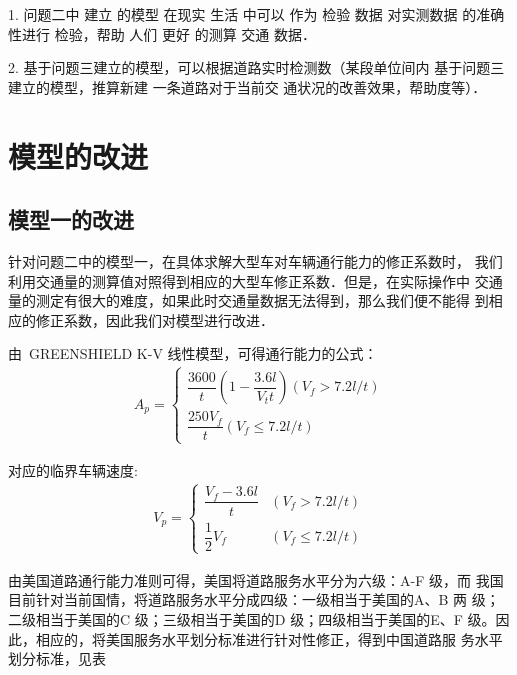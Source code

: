 \documentclass[12pt,a4paper]{nmmcm}
\begin{document}
1. 问题二中 建立 的模型 在现实 生活 中可以 作为 检验 数据 对实测数据 的准确 性进行 检验，帮助 人们
更好 的测算 交通 数据．

2. 基于问题三建立的模型，可以根据道路实时检测数（某段单位间内 基于问题三建立的模型，推算新建
一条道路对于当前交 通状况的改善效果，帮助度等）．

\section{模型的改进}

\subsection{模型一的改进}
针对问题二中的模型一，在具体求解大型车对车辆通行能力的修正系数时，
我们利用交通量的测算值对照得到相应的大型车修正系数．但是，在实际操作中
交通量的测定有很大的难度，如果此时交通量数据无法得到，那么我们便不能得
到相应的修正系数，因此我们对模型进行改进．

由~GREENSHIELD K-V 线性模型，可得通行能力的公式：
\begin{align}
  A_{p}=\begin{cases}
          \dfrac{3600}{t}\left(1-\dfrac{3.6 l}{V_{t} t}\right)\left(V_{f}>7.2 l / t\right) \\
          \dfrac{250 V_{f}}{t}\left(V_{f} \leq 7.2 l / t\right)
        \end{cases}
\end{align}

对应的临界车辆速度:
\begin{align}
  V_{p}=\begin{cases}
          \dfrac{V_{f}-3.6 l}{t} & \left(V_{f}>7.2 l / t\right)      \\
          \dfrac{1}{2} V_{f}     & \left(V_{f} \leq 7.2 l / t\right)
        \end{cases}
\end{align}

由美国道路通行能力准则可得，美国将道路服务水平分为六级：A-F 级，而
我国目前针对当前国情，将道路服务水平分成四级：一级相当于美国的A、B 两
级；二级相当于美国的C 级；三级相当于美国的D 级；四级相当于美国的E、F
级。因此，相应的，将美国服务水平划分标准进行针对性修正，得到中国道路服
务水平划分标准，见表
\end{document}
